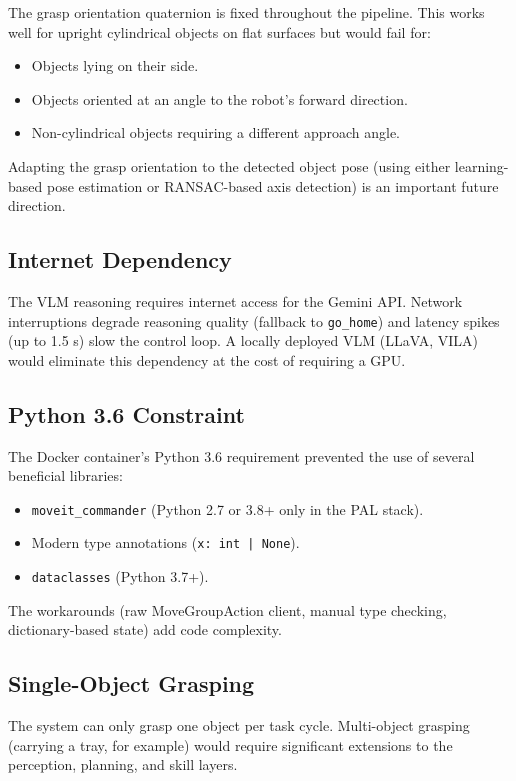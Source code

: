 The grasp orientation quaternion is fixed throughout the pipeline.
This works well for upright cylindrical objects on flat surfaces but would fail for:
\begin{itemize}[noitemsep]
  \item Objects lying on their side.
  \item Objects oriented at an angle to the robot's forward direction.
  \item Non-cylindrical objects requiring a different approach angle.
\end{itemize}

Adapting the grasp orientation to the detected object pose (using either
learning-based pose estimation or RANSAC-based axis detection) is an important
future direction.

\subsection{Internet Dependency}

The VLM reasoning requires internet access for the Gemini API.
Network interruptions degrade reasoning quality (fallback to \texttt{go\_home}) and
latency spikes (up to 1.5 s) slow the control loop.
A locally deployed VLM (LLaVA, VILA) would eliminate this dependency at the cost
of requiring a GPU.

\subsection{Python 3.6 Constraint}

The Docker container's Python 3.6 requirement prevented the use of several beneficial
libraries:
\begin{itemize}[noitemsep]
  \item \texttt{moveit\_commander} (Python 2.7 or 3.8+ only in the PAL stack).
  \item Modern type annotations (\texttt{x: int | None}).
  \item \texttt{dataclasses} (Python 3.7+).
\end{itemize}

The workarounds (raw MoveGroupAction client, manual type checking, dictionary-based
state) add code complexity.

\subsection{Single-Object Grasping}

The system can only grasp one object per task cycle.
Multi-object grasping (carrying a tray, for example) would require significant
extensions to the perception, planning, and skill layers.

